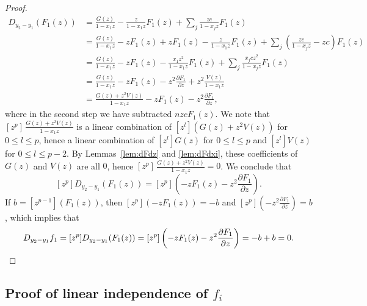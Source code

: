 \documentclass{amsart}
\numberwithin{equation}{section}
\theoremstyle{definition}
\begin{document}
\begin{proof}
\begin{align*}
D_{y_2-y_1}(F_1(z))&=\frac{G(z)}{1-x_1z}-\frac{z}{1-x_1z}F_1(z)+\sum_{j} \frac{zc}{1-x_jz}F_1(z)\\
&=\frac{G(z)}{1-x_1z}-zF_1(z)+zF_1(z)-\frac{z}{1-x_1z}F_1(z) + \sum_{j} \left(\frac{zc}{1-x_jz} - zc\right) F_1(z)\\
&=\frac{G(z)}{1-x_1z}-zF_1(z)-\frac{x_1z^2}{1-x_1z}F_1(z)+\sum_{j} \frac{x_jcz^2}{1-x_jz}F_1(z)\\
&=\frac{G(z)}{1-x_1z}-zF_1(z)-z^2\frac{\partial F_1}{\partial z}+z^2\frac{V(z)}{1-x_1z}\\
&=\frac{G(z)+z^2V(z)}{1-x_1z}-zF_1(z)-z^2\frac{\partial F_1}{\partial z},
\end{align*}
where in the second step we have subtracted $n zc F_1(z)$.  We note that $[z^p]\,\frac{G(z)+z^2V(z)}{1-x_1z}$ is a linear combination of $[z^l](G(z)+z^2V(z))$ for $0 \le l \le p$, hence a linear combination of $[z^l]G(z)$ for $0 \le l \le p$ and $[z^l]V(z)$ for $0 \le l \le p-2$. By Lemmas~\ref{lem:dFdz} and \ref{lem:dFdxi}, these coefficients of $G(z)$ and $V(z)$ are all $0$, hence $[z^p]\,\frac{G(z)+z^2V(z)}{1-x_1z}=0$. We conclude that 
\[
[z^p]D_{y_2-y_1}(F_1(z))=[z^p]\left(-zF_1(z)-z^2\frac{\partial F_1}{\partial z}\right).
\]
If $b=[z^{p-1}](F_1(z))$, then $[z^p](-zF_1(z))=-b$ and $[z^p]\left(-z^2\frac{\partial F_1}{\partial z}\right)=b$, which implies that 
\[
D_{y_2 - y_1} f_1 = [z^p]D_{y_2-y_1}(F_1(z))= [z^p]\left(-zF_1(z)-z^2\frac{\partial F_1}{\partial z}\right) = -b + b = 0. \qedhere
\]
\end{proof}

\subsection{Proof of linear independence of $f_i$}
\end{document}

